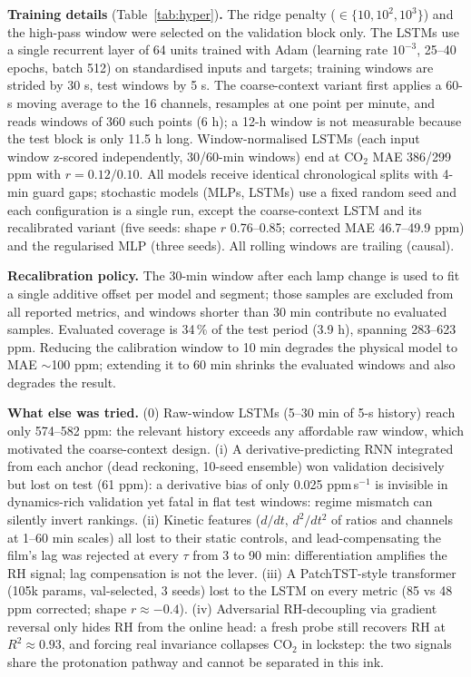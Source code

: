 \documentclass[twocolumn]{revtex4}
\begin{document}
{\bf Training details} (Table~\ref{tab:hyper}){\bf .} The ridge penalty ($\in\{10,10^2,10^3\}$) and the
high-pass window were selected on the validation block only. The LSTMs use a
single recurrent layer of 64 units trained with Adam (learning rate
$10^{-3}$, 25--40 epochs, batch 512) on standardised inputs and targets;
training windows are strided by 30 s, test windows by 5 s. The coarse-context
variant first applies a 60-s moving average to the 16 channels, resamples at
one point per minute, and reads windows of 360 such points (6 h); a 12-h
window is not measurable because the test block is only 11.5 h long.
Window-normalised LSTMs (each input window z-scored independently, 30/60-min
windows) end at CO$_2$ MAE 386/299 ppm with $r=0.12/0.10$. All models receive identical
chronological splits with 4-min guard gaps; stochastic models (MLPs,
LSTMs) use a fixed random seed and each configuration is a single run,
except the coarse-context LSTM and its recalibrated variant (five
seeds: shape $r$ 0.76--0.85; corrected MAE 46.7--49.9 ppm) and the
regularised MLP (three seeds). All rolling windows are trailing
(causal).

{\bf Recalibration policy.} The 30-min window after each lamp change is used
to fit a single additive offset per model and segment; those samples are
excluded from all reported metrics, and windows shorter than 30 min
contribute no evaluated samples. Evaluated coverage is 34\,\% of the test
period (3.9 h), spanning 283--623 ppm. Reducing the calibration window to
10 min degrades the physical model to MAE $\sim$100 ppm; extending it to
60 min shrinks the evaluated windows and also degrades the result.

{\bf What else was tried.} (0) Raw-window LSTMs (5--30 min of 5-s
history) reach only 574--582 ppm: the relevant history exceeds any
affordable raw window, which motivated the coarse-context design.
(i) A derivative-predicting RNN integrated
from each anchor (dead reckoning, 10-seed ensemble) won validation
decisively but lost on test (61 ppm): a derivative bias of only
0.025 ppm\,s$^{-1}$ is invisible in dynamics-rich validation yet fatal in
flat test windows: regime mismatch can silently invert rankings.
(ii) Kinetic features ($d/dt$, $d^2/dt^2$ of ratios and channels at 1--60
min scales) all lost to their static controls, and lead-compensating the
film's lag was rejected at every $\tau$ from 3 to 90 min: differentiation
amplifies the RH signal; lag compensation is not the lever. (iii) A
PatchTST-style transformer (105k params, val-selected, 3 seeds) lost to the
LSTM on every metric (85 vs 48 ppm corrected; shape $r\approx-0.4$).
(iv) Adversarial RH-decoupling via gradient reversal only hides RH from
the online head: a fresh probe still recovers RH at $R^2\approx0.93$, and
forcing real invariance collapses CO$_2$ in lockstep: the two signals
share the protonation pathway and cannot be separated in this ink.
\end{document}
